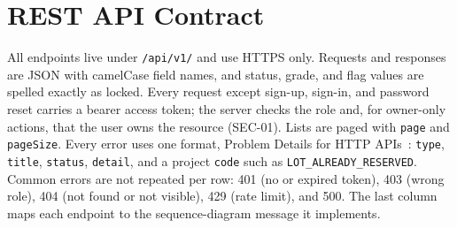 \section{REST API Contract}
\label{sec:rest-api}
All endpoints live under \texttt{/api/v1/} and use HTTPS only. Requests and responses are
JSON with camelCase field names, and status, grade, and flag values are spelled exactly as
locked. Every request except sign-up, sign-in, and password reset carries a bearer access
token; the server checks the role and, for owner-only actions, that the user owns the
resource (SEC-01). Lists are paged with \texttt{page} and \texttt{pageSize}. Every error
uses one format, Problem Details for HTTP APIs~\citep{rfc9457}: \texttt{type},
\texttt{title}, \texttt{status}, \texttt{detail}, and a project \texttt{code} such as
\texttt{LOT\_ALREADY\_RESERVED}. Common errors are not repeated per row: 401 (no or expired
token), 403 (wrong role), 404 (not found or not visible), 429 (rate limit), and 500.
The last column maps each endpoint to the sequence-diagram message it implements.

